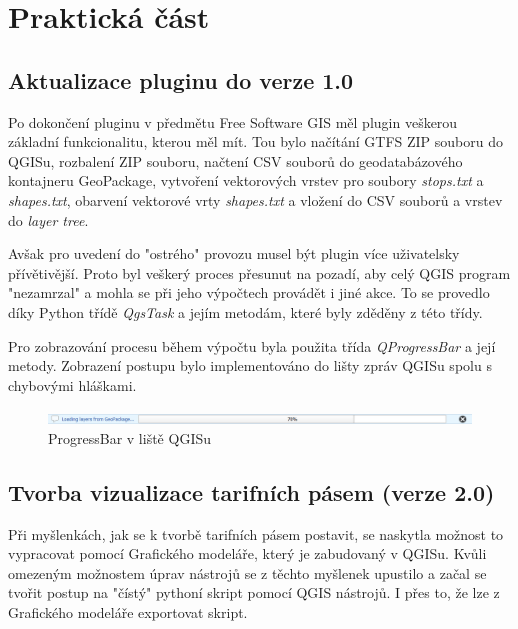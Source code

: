 \chapter{Praktická část}
\label{5-postup}

\section{Aktualizace pluginu do verze 1.0}
Po dokončení pluginu v předmětu Free Software GIS měl plugin veškerou základní 
funkcionalitu, kterou měl mít. Tou bylo načítání GTFS ZIP souboru do QGISu,
rozbalení ZIP souboru, načtení CSV souborů do geodatabázového kontajneru GeoPackage,
vytvoření vektorových vrstev pro soubory \textit{stops.txt} a \textit{shapes.txt},
obarvení vektorové vrty \textit{shapes.txt} a vložení do CSV souborů a vrstev do
\textit{layer tree}.

Avšak pro uvedení do "ostrého" provozu musel být plugin více uživatelsky přívětivější.
Proto byl veškerý proces přesunut na pozadí, aby celý QGIS program "nezamrzal" a
mohla se při jeho výpočtech provádět i jiné akce. To se provedlo díky Python třídě \textit{QgsTask}
a jejím metodám, které byly zděděny z této třídy. \cite{QgsTask}

Pro zobrazování procesu během výpočtu byla použita třída \textit{QProgressBar} a její metody.
Zobrazení postupu bylo implementováno do lišty zpráv QGISu spolu s chybovými hláškami.

\begin{figure}[H] \centering
    \includegraphics[width=400pt]{./pictures/loading.png}
    \caption[ProgressBar]{ProgressBar v liště QGISu}
	\label{fig:ProgressBar v liště QGISu}              
\end{figure}     


\section{Tvorba vizualizace tarifních pásem (verze 2.0)}

Při myšlenkách, jak se k tvorbě tarifních pásem postavit,
se naskytla možnost to vypracovat pomocí Grafického modeláře, který je zabudovaný v QGISu. 
Kvůli omezeným možnostem úprav nástrojů se z těchto myšlenek upustilo a začal se tvořit postup
na "čístý" pythoní skript pomocí QGIS nástrojů. I přes to, že lze z Grafického modeláře exportovat skript. 

